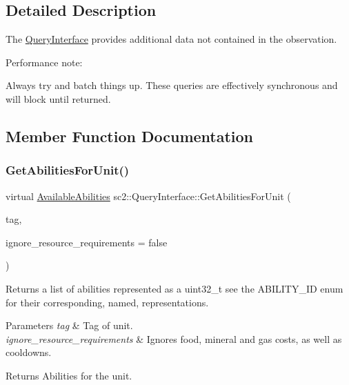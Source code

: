 \subsection{Detailed Description}
The \hyperlink{classsc2_1_1_query_interface}{Query\+Interface} provides additional data not contained in the observation.

Performance note\+:
\begin{DoxyItemize}
\item Always try and batch things up. These queries are effectively synchronous and will block until returned. 
\end{DoxyItemize}

\subsection{Member Function Documentation}
\mbox{\label{classsc2_1_1_query_interface_a6954d65b93a07bf14e2a8818f9df9b8c}} 
\subsubsection{\texorpdfstring{Get\+Abilities\+For\+Unit()}{GetAbilitiesForUnit()}}
{\footnotesize\ttfamily virtual \hyperlink{structsc2_1_1_available_abilities}{Available\+Abilities} sc2\+::\+Query\+Interface\+::\+Get\+Abilities\+For\+Unit (\begin{DoxyParamCaption}\item[{Tag}]{tag,  }\item[{bool}]{ignore\+\_\+resource\+\_\+requirements = {\ttfamily false} }\end{DoxyParamCaption})\hspace{0.3cm}{\ttfamily [pure virtual]}}

Returns a list of abilities represented as a uint32\+\_\+t see the A\+B\+I\+L\+I\+T\+Y\+\_\+\+ID enum for their corresponding, named, representations. 
\begin{DoxyParams}{Parameters}
{\em tag} & Tag of unit. \\
\hline
{\em ignore\+\_\+resource\+\_\+requirements} & Ignores food, mineral and gas costs, as well as cooldowns. \\
\hline
\end{DoxyParams}
\begin{DoxyReturn}{Returns}
Abilities for the unit. 
\end{DoxyReturn}
\mbox{\label{classsc2_1_1_query_interface_a6add52c8b04f0e50efdd83955952b76f}} 
